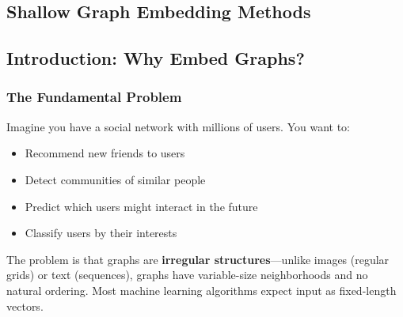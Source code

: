 \begin{notechapter}
\chapter{Shallow Graph Embedding Methods}\label{ch:shallow-embeddings}

\begin{abstract}
This document provides a thorough treatment of shallow graph embedding methods, designed to build genuine understanding through concrete examples and visualizations. We develop the theoretical foundations of matrix factorization-based approaches (Graph Factorization, HOPE, GraRep) and skip-gram-based methods (DeepWalk, Node2Vec), followed by a comprehensive treatment of \textbf{multi-relational graph embeddings} for knowledge graphs (RESCAL, DistMult, TransE, ComplEx, RotatE). Throughout, we emphasize \emph{why} each concept matters and \emph{how} it connects to practical applications, with full mathematical derivations, proofs, and worked examples that go well beyond typical textbook coverage.
\end{abstract}

\section{Introduction: Why Embed Graphs?}

\subsection{The Fundamental Problem}

Imagine you have a social network with millions of users. You want to:
\begin{itemize}
    \item Recommend new friends to users
    \item Detect communities of similar people
    \item Predict which users might interact in the future
    \item Classify users by their interests
\end{itemize}

The problem is that graphs are \textbf{irregular structures}---unlike images (regular grids) or text (sequences), graphs have variable-size neighborhoods and no natural ordering. Most machine learning algorithms expect input as fixed-length vectors.


\end{notechapter}
